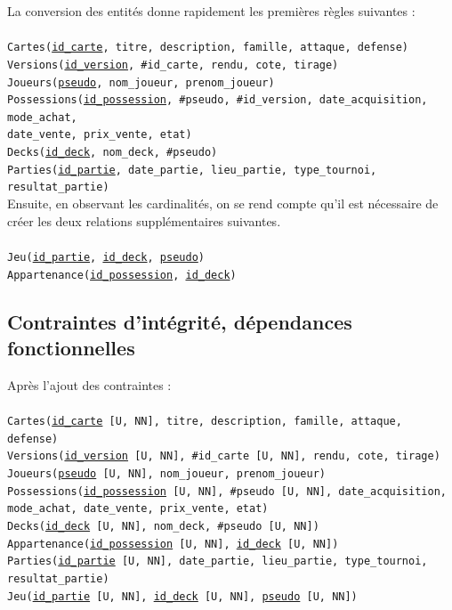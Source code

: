 \documentclass[a4paper,10.5pt]{article}
\begin{document}
La conversion des entités donne rapidement les premières règles suivantes :\\
\\
\texttt{Cartes(\underline{id\_carte}, titre, description, famille, attaque, defense)} \\
\texttt{Versions(\underline{id\_version}, \#id\_carte, rendu, cote, tirage)} \\
\texttt{Joueurs(\underline{pseudo}, nom\_joueur, prenom\_joueur)} \\
\texttt{Possessions(\underline{id\_possession}, \#pseudo, \#id\_version, date\_acquisition, mode\_achat,\\ date\_vente, prix\_vente, etat)} \\
\texttt{Decks(\underline{id\_deck}, nom\_deck, \#pseudo)} \\
\texttt{Parties(\underline{id\_partie}, date\_partie, lieu\_partie, type\_tournoi, resultat\_partie)} \\

Ensuite, en observant les cardinalités, on se rend compte qu'il est nécessaire de créer les deux relations supplémentaires suivantes. \\
\\
\texttt{Jeu(\underline{id\_partie}, \underline{id\_deck}, \underline{pseudo})} \\
\texttt{Appartenance(\underline{id\_possession}, \underline{id\_deck})} \\

\subsection{Contraintes d'intégrité, dépendances fonctionnelles}
Après l'ajout des contraintes : \\
\\
\texttt{Cartes(\underline{id\_carte} [U, NN], titre, description, famille, attaque, defense)} \\
\texttt{Versions(\underline{id\_version} [U, NN], \#id\_carte [U, NN], rendu, cote, tirage)} \\
\texttt{Joueurs(\underline{pseudo} [U, NN], nom\_joueur, prenom\_joueur)} \\
\texttt{Possessions(\underline{id\_possession} [U, NN], \#pseudo [U, NN], date\_acquisition, mode\_achat, date\_vente, prix\_vente, etat)} \\
\texttt{Decks(\underline{id\_deck} [U, NN], nom\_deck, \#pseudo [U, NN])} \\
\texttt{Appartenance(\underline{id\_possession} [U, NN], \underline{id\_deck} [U, NN])} \\
\texttt{Parties(\underline{id\_partie} [U, NN], date\_partie, lieu\_partie, type\_tournoi, resultat\_partie)} \\
\texttt{Jeu(\underline{id\_partie} [U, NN], \underline{id\_deck} [U, NN], \underline{pseudo} [U, NN])} \\
\end{document}
